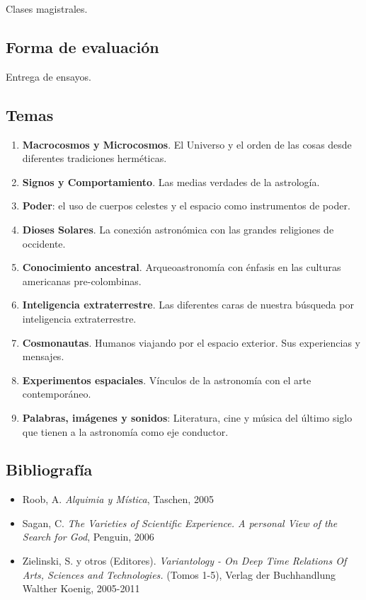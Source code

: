 \documentclass{report}
\begin{document}
Clases magistrales.

\subsection*{Forma de evaluaci\'on}

Entrega de ensayos.

\subsection*{Temas}

\begin{enumerate}
\item {\bf Macrocosmos y Microcosmos}. El Universo y el orden de las
  cosas desde diferentes tradiciones herm\'eticas.
\item {\bf Signos y Comportamiento}. Las medias verdades de la astrolog\'ia.
\item {\bf Poder}: el uso de cuerpos celestes y el espacio como instrumentos de poder. 
\item {\bf Dioses Solares}. La conexi\'on astron\'omica con las grandes religiones de occidente. 
\item {\bf Conocimiento ancestral}. Arqueoastronom\'ia con \'enfasis en las culturas americanas pre-colombinas.
\item {\bf Inteligencia extraterrestre}. Las diferentes caras de
  nuestra b\'usqueda por inteligencia extraterrestre.
\item {\bf Cosmonautas}. Humanos viajando por el espacio exterior. Sus experiencias y mensajes.
\item {\bf Experimentos espaciales}. V\'inculos de la astronom\'ia con
  el arte contempor\'aneo.
\item {\bf Palabras, im\'agenes y sonidos}: Literatura, cine y
  m\'usica del \'ultimo siglo que tienen a la astronom\'ia como eje conductor.
\end{enumerate}

\subsection*{Bibliografía}

\begin{itemize}
\item Roob, A. \emph{Alquimia y M\'istica}, Taschen, 2005
\item Sagan, C. \emph{The Varieties of Scientific Experience. A personal View of the Search for God}, Penguin, 2006
\item Zielinski, S. y otros (Editores). \emph{Variantology - On Deep Time
  Relations Of Arts, Sciences and Technologies.} (Tomos 1-5), Verlag
der Buchhandlung Walther Koenig, 2005-2011
\end{itemize}
\end{document}
